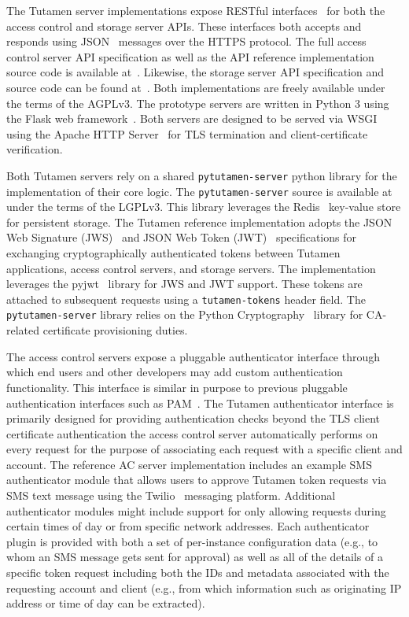 The Tutamen server implementations expose RESTful
interfaces~\cite{fielding2000} for both the access control and storage
server APIs. These interfaces both accepts and responds using
JSON~\cite{json} messages over the HTTPS protocol. The full access
control server API specification as well as the API reference
implementation source code is available
at~\cite{src-tutamen-apiaccesscontrol}. Likewise, the storage server
API specification and source code can be found
at~\cite{src-tutamen-apistorage}. Both implementations are freely
available under the terms of the AGPLv3. The prototype servers are
written in Python 3 using the Flask web
framework~\cite{python-flask}. Both servers are designed to be served
via WSGI~\cite{pep3333} using the Apache HTTP Server~\cite{apache} for
TLS termination and client-certificate verification.

Both Tutamen servers rely on a shared \texttt{pytutamen-server} python
library for the implementation of their core logic. The
\texttt{pytutamen-server} source is available
at~\cite{src-tutamen-pytutamenserver} under the terms of the
LGPLv3. This library leverages the Redis~\cite{redis} key-value store
for persistent storage. The Tutamen reference implementation adopts
the JSON Web Signature (JWS)~\cite{rfc7515} and JSON Web Token
(JWT)~\cite{rfc7519} specifications for exchanging cryptographically
authenticated tokens between Tutamen applications, access control
servers, and storage servers. The implementation leverages the
pyjwt~\cite{pyjwt} library for JWS and JWT support. These tokens are
attached to subsequent requests using a \texttt{tutamen-tokens} header
field. The \texttt{pytutamen-server} library relies on the Python
Cryptography~\cite{python-cryptography} library for CA-related
certificate provisioning duties.

The access control servers expose a pluggable authenticator interface
through which end users and other developers may add custom
authentication functionality. This interface is similar in purpose to
previous pluggable authentication interfaces such as
PAM~\cite{samar1996}. The Tutamen authenticator interface is primarily
designed for providing authentication checks beyond the TLS client
certificate authentication the access control server automatically
performs on every request for the purpose of associating each request
with a specific client and account. The reference AC server
implementation includes an example SMS authenticator module that
allows users to approve Tutamen token requests via SMS text message
using the Twilio~\cite{twilio} messaging platform. Additional
authenticator modules might include support for only allowing requests
during certain times of day or from specific network addresses. Each
authenticator plugin is provided with both a set of per-instance
configuration data (e.g., to whom an SMS message gets sent for
approval) as well as all of the details of a specific token request
including both the IDs and metadata associated with the requesting
account and client (e.g., from which information such as originating
IP address or time of day can be extracted).

